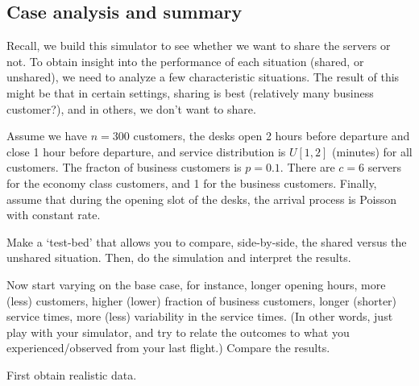 \subsection{Case analysis and summary}
\label{sec:cases}

Recall, we build this simulator to see whether we want to share the servers or not.
To obtain insight into the performance of each situation (shared, or unshared), we need to analyze a few characteristic situations.
The result of this might be that in certain settings, sharing is best (relatively many business customer?), and in others, we don't want to share. 

\begin{exercise}
  Assume we have $n=300$ customers, the desks open 2 hours before departure and close 1 hour before departure, and service distribution is $U[1,2]$ (minutes) for  all customers. The fracton of business customers is $p=0.1$. There are $c=6$ servers for the economy class customers, and 1 for the business customers. Finally, assume that during the opening slot of the desks, the arrival process is Poisson with constant rate. 

Make a `test-bed' that allows you to compare, side-by-side, the shared versus the unshared situation. Then, do the simulation and interpret the results.
\end{exercise}

\begin{exercise}
  Now start varying on the base case, for instance, longer opening hours, more (less) customers, higher (lower) fraction of business customers, longer (shorter) service times, more (less) variability in the service times.  (In other words, just play with your simulator, and try to relate the outcomes to what you experienced/observed from your last flight.) Compare the results.
\end{exercise}

\begin{exercise}
  \begin{solution}
    First obtain realistic data.

  \end{solution}
\end{exercise}


